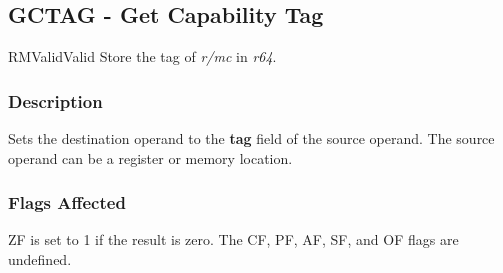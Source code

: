 \clearpage
{}
{}
\subsection*{GCTAG - Get Capability Tag}

\begin{x86opcodetable}
  {RM}{Valid}{Valid}
  {Store the tag of \emph{r/mc} in \emph{r64}.}
\end{x86opcodetable}

\begin{x86opentable}
\end{x86opentable}

\subsubsection*{Description}

Sets the destination operand to the \textbf{tag} field of the source
operand.  The source operand can be a register or memory location.

\subsubsection*{Flags Affected}

ZF is set to 1 if the result is zero.  The CF, PF, AF, SF, and OF
flags are undefined.
